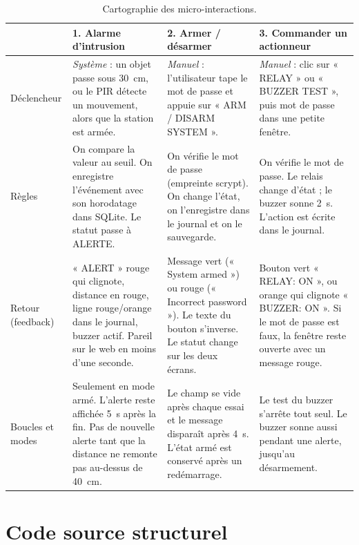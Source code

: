 \documentclass[11pt,a4paper]{article}
\begin{document}
\begin{table}[H]
\centering\small
\renewcommand{\arraystretch}{1.25}
\begin{tabularx}{\linewidth}{>{\bfseries\raggedright}p{2.1cm} >{\raggedright\arraybackslash}X >{\raggedright\arraybackslash}X >{\raggedright\arraybackslash}X}
\toprule
 & \textbf{1. Alarme d'intrusion} & \textbf{2. Armer / désarmer} & \textbf{3. Commander un actionneur} \\
\midrule
Déclencheur &
  \emph{Système} : un objet passe sous 30~cm, ou le PIR détecte un mouvement, alors que la station est armée. &
  \emph{Manuel} : l'utilisateur tape le mot de passe et appuie sur « ARM / DISARM SYSTEM ». &
  \emph{Manuel} : clic sur « RELAY » ou « BUZZER TEST », puis mot de passe dans une petite fenêtre. \\
Règles &
  On compare la valeur au seuil. On enregistre l'événement avec son horodatage dans SQLite. Le statut passe à ALERTE. &
  On vérifie le mot de passe (empreinte scrypt). On change l'état, on l'enregistre dans le journal et on le sauvegarde. &
  On vérifie le mot de passe. Le relais change d'état ; le buzzer sonne 2~s. L'action est écrite dans le journal. \\
Retour (feedback) &
  « ALERT » rouge qui clignote, distance en rouge, ligne rouge/orange dans le journal, buzzer actif. Pareil sur le web en moins d'une seconde. &
  Message vert (« System armed ») ou rouge (« Incorrect password »). Le texte du bouton s'inverse. Le statut change sur les deux écrans. &
  Bouton vert « RELAY: ON », ou orange qui clignote « BUZZER: ON ». Si le mot de passe est faux, la fenêtre reste ouverte avec un message rouge. \\
Boucles et modes &
  Seulement en mode armé. L'alerte reste affichée 5~s après la fin. Pas de nouvelle alerte tant que la distance ne remonte pas au-dessus de 40~cm. &
  Le champ se vide après chaque essai et le message disparaît après 4~s. L'état armé est conservé après un redémarrage. &
  Le test du buzzer s'arrête tout seul. Le buzzer sonne aussi pendant une alerte, jusqu'au désarmement. \\
\bottomrule
\end{tabularx}
\caption{Cartographie des micro-interactions.}
\end{table}

\newpage
\section{Code source structurel}
\end{document}
